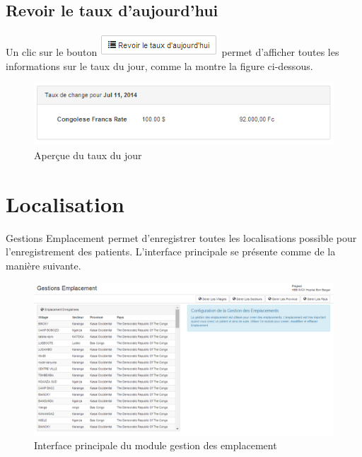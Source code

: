 \documentclass[12pt,a4paper]{report}
\begin{document}
\subsection{Revoir le taux d'aujourd'hui}
Un clic sur le bouton \includegraphics[scale=0.7]{pic/RevoirTaux.png} permet d'afficher toutes les informations sur le taux du jour, comme la montre la figure ci-dessous.
\begin{figure}[h]
\begin{center}
\includegraphics[width=12cm]{pic/ShowRate.png}
\end{center}
\caption{Aperçue du taux du jour}
\label{Aperçue du taux du jour}
\end{figure}
\newpage
\section{Localisation}
Gestions Emplacement permet d'enregistrer toutes les localisations possible pour l'enregistrement des patients. L'interface principale se présente comme de la manière suivante.

\begin{figure}[h]
\begin{center}
\includegraphics[width=14cm]{pic/AdminLocalisation.png}
\end{center}
\caption{Interface principale du module gestion des emplacement}
\label{Interface principale du module gestion des emplacement}
\end{figure}
\end{document}
